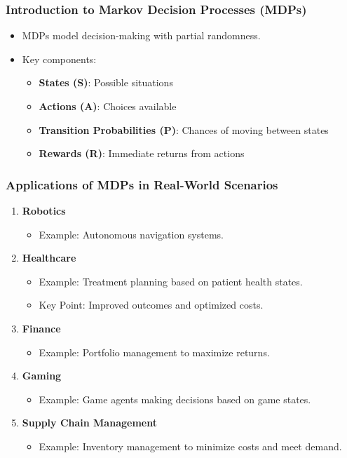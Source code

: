 \documentclass[aspectratio=169]{beamer}
\begin{document}
\begin{frame}[fragile]
  \frametitle{Introduction to Markov Decision Processes (MDPs)}
  \begin{itemize}
    \item MDPs model decision-making with partial randomness.
    \item Key components:
      \begin{itemize}
        \item \textbf{States (S)}: Possible situations
        \item \textbf{Actions (A)}: Choices available
        \item \textbf{Transition Probabilities (P)}: Chances of moving between states
        \item \textbf{Rewards (R)}: Immediate returns from actions
      \end{itemize}
  \end{itemize}
\end{frame}

\begin{frame}[fragile]
  \frametitle{Applications of MDPs in Real-World Scenarios}
  \begin{enumerate}
    \item \textbf{Robotics}
      \begin{itemize}
        \item Example: Autonomous navigation systems.
      \end{itemize}
    \item \textbf{Healthcare}
      \begin{itemize}
        \item Example: Treatment planning based on patient health states.
        \item Key Point: Improved outcomes and optimized costs.
      \end{itemize}
    \item \textbf{Finance}
      \begin{itemize}
        \item Example: Portfolio management to maximize returns.
      \end{itemize}
    \item \textbf{Gaming}
      \begin{itemize}
        \item Example: Game agents making decisions based on game states.
      \end{itemize}
    \item \textbf{Supply Chain Management}
      \begin{itemize}
        \item Example: Inventory management to minimize costs and meet demand.
      \end{itemize}
  \end{enumerate}
\end{frame}
\end{document}
